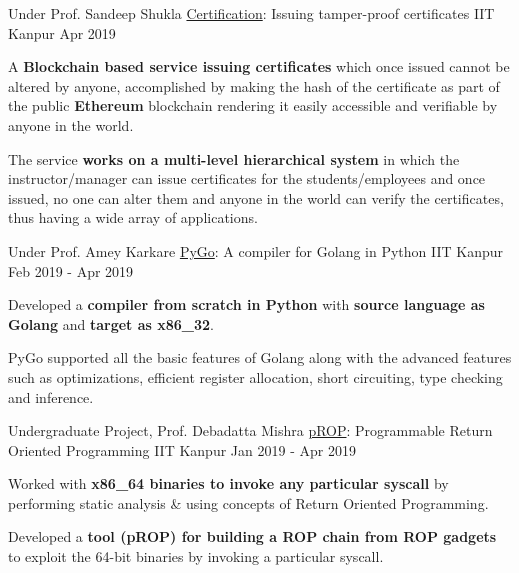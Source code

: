 \begin{cventries}


  \cventry
    {Under Prof. Sandeep Shukla} %
    {\href{https://github.com/ayush268/certification}{Certification}: Issuing tamper-proof certificates} %
    {IIT Kanpur} %
    {Apr 2019} %
    {
      \begin{cvitems} %
        \item {A \textbf{Blockchain based service issuing certificates} which once issued cannot be altered by anyone, accomplished by making the hash of the certificate as part of the public \textbf{Ethereum} blockchain rendering it easily accessible and verifiable by anyone in the world.}
        \item {The service \textbf{works on a multi-level hierarchical system} in which the instructor/manager can issue certificates for the students/employees and once issued, no one can alter them and anyone in the world can verify the certificates, thus having a wide array of applications.}
      \end{cvitems}
    }



  \cventry
    {Under Prof. Amey Karkare} %
    {\href{https://github.com/hritwik567/PyGo}{PyGo}: A compiler for Golang in Python} %
    {IIT Kanpur} %
    {Feb 2019 - Apr 2019} %
    {
      \begin{cvitems} %
      \item {Developed a \textbf{compiler from scratch in Python} with \textbf{source language as Golang} and \textbf{target as x86\_32}.}
      \item {PyGo supported all the basic features of Golang along with the advanced features such as optimizations, efficient register allocation, short circuiting, type checking and inference.}
      \end{cvitems}
    }



  \cventry
    {Undergraduate Project, Prof. Debadatta Mishra} %
    {\href{https://arxiv.org/abs/2111.03537}{pROP}: Programmable Return Oriented Programming} %
    {IIT Kanpur} %
    {Jan 2019 - Apr 2019} %
    {
      \begin{cvitems} %
      \item {Worked with \textbf{x86\_64 binaries to invoke any particular syscall} by performing static analysis \& using concepts of Return Oriented Programming.}
      \item {Developed a \textbf{tool (pROP) for building a ROP chain from ROP gadgets} to exploit the 64-bit binaries by invoking a particular syscall.}
      \end{cvitems}
    }


\end{cventries}
